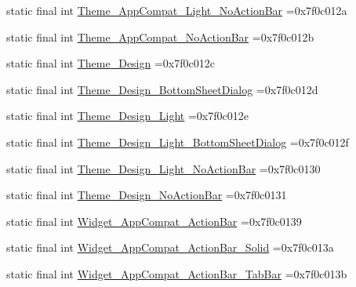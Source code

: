 \begin{DoxyCompactItemize}
\item 
static final int \mbox{\hyperlink{classbr_1_1unb_1_1cic_1_1mp_1_1marketmaster_1_1test_1_1R_1_1style_a5a7f11e0e39286d9cba25d8f0368b9c6}{Theme\+\_\+\+App\+Compat\+\_\+\+Light\+\_\+\+No\+Action\+Bar}} =0x7f0c012a
\item 
static final int \mbox{\hyperlink{classbr_1_1unb_1_1cic_1_1mp_1_1marketmaster_1_1test_1_1R_1_1style_ad954a21b1068e825bbc0ce143189bdf3}{Theme\+\_\+\+App\+Compat\+\_\+\+No\+Action\+Bar}} =0x7f0c012b
\item 
static final int \mbox{\hyperlink{classbr_1_1unb_1_1cic_1_1mp_1_1marketmaster_1_1test_1_1R_1_1style_acb9e39724e5e9001be9bf43bd80c54ce}{Theme\+\_\+\+Design}} =0x7f0c012c
\item 
static final int \mbox{\hyperlink{classbr_1_1unb_1_1cic_1_1mp_1_1marketmaster_1_1test_1_1R_1_1style_a93e64f7c3f354eec7152320fa022d662}{Theme\+\_\+\+Design\+\_\+\+Bottom\+Sheet\+Dialog}} =0x7f0c012d
\item 
static final int \mbox{\hyperlink{classbr_1_1unb_1_1cic_1_1mp_1_1marketmaster_1_1test_1_1R_1_1style_aedfd7039873213b1aa434cfd3888a24a}{Theme\+\_\+\+Design\+\_\+\+Light}} =0x7f0c012e
\item 
static final int \mbox{\hyperlink{classbr_1_1unb_1_1cic_1_1mp_1_1marketmaster_1_1test_1_1R_1_1style_ae751276a13cad845bacdc625b52d6a68}{Theme\+\_\+\+Design\+\_\+\+Light\+\_\+\+Bottom\+Sheet\+Dialog}} =0x7f0c012f
\item 
static final int \mbox{\hyperlink{classbr_1_1unb_1_1cic_1_1mp_1_1marketmaster_1_1test_1_1R_1_1style_a6bc7be112011ac67620d51e8f6ef86ab}{Theme\+\_\+\+Design\+\_\+\+Light\+\_\+\+No\+Action\+Bar}} =0x7f0c0130
\item 
static final int \mbox{\hyperlink{classbr_1_1unb_1_1cic_1_1mp_1_1marketmaster_1_1test_1_1R_1_1style_a42c7903d07cebc9a8ef4c07b75bc6a95}{Theme\+\_\+\+Design\+\_\+\+No\+Action\+Bar}} =0x7f0c0131
\item 
static final int \mbox{\hyperlink{classbr_1_1unb_1_1cic_1_1mp_1_1marketmaster_1_1test_1_1R_1_1style_aec4b22814d3e1e2ee16e3b4f7b326885}{Widget\+\_\+\+App\+Compat\+\_\+\+Action\+Bar}} =0x7f0c0139
\item 
static final int \mbox{\hyperlink{classbr_1_1unb_1_1cic_1_1mp_1_1marketmaster_1_1test_1_1R_1_1style_a032f771de51a4921cbccfe62db26cb86}{Widget\+\_\+\+App\+Compat\+\_\+\+Action\+Bar\+\_\+\+Solid}} =0x7f0c013a
\item 
static final int \mbox{\hyperlink{classbr_1_1unb_1_1cic_1_1mp_1_1marketmaster_1_1test_1_1R_1_1style_af247ab3f8c05c907ee90290913c0a48b}{Widget\+\_\+\+App\+Compat\+\_\+\+Action\+Bar\+\_\+\+Tab\+Bar}} =0x7f0c013b

\end{DoxyCompactItemize}
